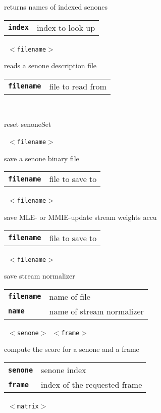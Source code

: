 \begin{description}
\begin{description}
        returns names of indexed senones

      \begin{tabular}{ll}
 \texttt{\textbf{index}} &  index to look up  \\
      \end{tabular}
       \texttt{ $<$filename$>$} \

        reads a senone description file

      \begin{tabular}{ll}
 \texttt{\textbf{filename}} &  file to read from  \\
      \end{tabular}
       \texttt{} \

        reset senoneSet

       \texttt{ $<$filename$>$} \

        save a senone binary file

      \begin{tabular}{ll}
 \texttt{\textbf{filename}} &  file to save to  \\
      \end{tabular}
       \texttt{ $<$filename$>$} \

        save MLE- or MMIE-update stream weights accu

      \begin{tabular}{ll}
 \texttt{\textbf{filename}} &  file to save to  \\
      \end{tabular}
       \texttt{ $<$filename$>$ } \

        save stream normalizer

      \begin{tabular}{ll}
 \texttt{\textbf{filename}} &  name of file  \\
 \texttt{\textbf{name}} &       name of stream normalizer  \\
      \end{tabular}
       \texttt{ $<$senone$>$ $<$frame$>$} \

        compute the score for a senone and a frame

      \begin{tabular}{ll}
 \texttt{\textbf{senone}} &  senone index  \\
 \texttt{\textbf{frame}} &   index of the requested frame  \\
      \end{tabular}
       \texttt{ $<$matrix$>$  } \


\end{description}
\end{description}
